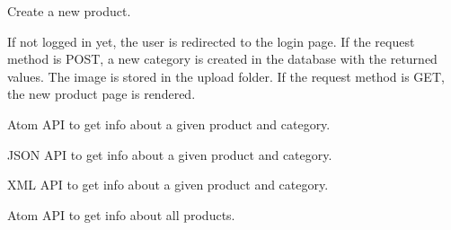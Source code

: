 \documentclass[letterpaper,10pt,english]{sphinxmanual}
\begin{document}

\begin{fulllineitems}
\label{application:application.newProduct}
Create a new product.

If not logged in yet, the user is redirected to
the login page.
If the request method is POST, a new category is created
in the database with the returned values. The image is
stored in the upload folder.
If the request method is GET, the new product page is
rendered.

\end{fulllineitems}


\begin{fulllineitems}
\label{application:application.productAtom}
Atom API to get info about a given product and category.

\end{fulllineitems}


\begin{fulllineitems}
\label{application:application.productJSON}
JSON API to get info about a given product and category.

\end{fulllineitems}


\begin{fulllineitems}
\label{application:application.productXML}
XML API to get info about a given product and category.

\end{fulllineitems}


\begin{fulllineitems}
\label{application:application.productsAtom}
Atom API to get info about all products.

\end{fulllineitems}
\end{document}
